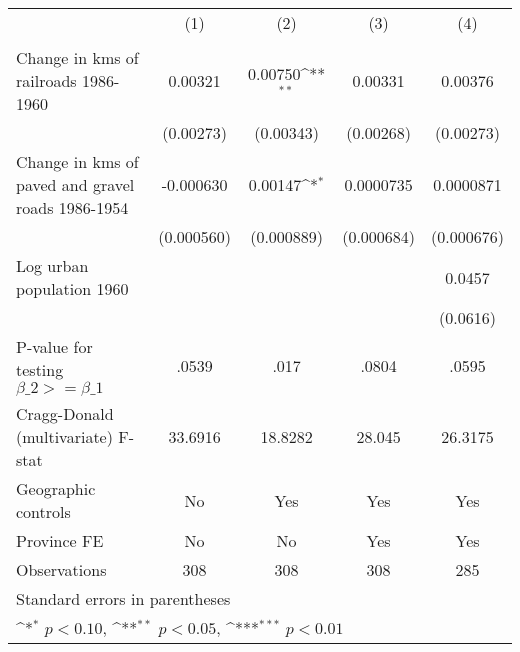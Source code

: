 {
\def\sym#1{\ifmmode^{#1}\else\(^{#1}\)\fi}
\begin{tabular}{l*{4}{c}}
\hline\hline
                &\multicolumn{1}{c}{(1)}&\multicolumn{1}{c}{(2)}&\multicolumn{1}{c}{(3)}&\multicolumn{1}{c}{(4)}\\
                &\multicolumn{1}{c}{}&\multicolumn{1}{c}{}&\multicolumn{1}{c}{}&\multicolumn{1}{c}{}\\
\hline
Change in kms of railroads 1986-1960&  0.00321         &  0.00750\sym{**} &  0.00331         &  0.00376         \\
                &(0.00273)         &(0.00343)         &(0.00268)         &(0.00273)         \\
[1em]
Change in kms of paved and gravel roads 1986-1954&-0.000630         &  0.00147\sym{*}  &0.0000735         &0.0000871         \\
                &(0.000560)         &(0.000889)         &(0.000684)         &(0.000676)         \\
[1em]
Log urban population 1960&                  &                  &                  &   0.0457         \\
                &                  &                  &                  & (0.0616)         \\
\hline
P-value for testing $\beta\_{2} >= \beta\_{1}$&    .0539         &     .017         &    .0804         &    .0595         \\
Cragg-Donald (multivariate) F-stat&  33.6916         &  18.8282         &   28.045         &  26.3175         \\
Geographic controls&       No         &      Yes         &      Yes         &      Yes         \\
Province FE     &       No         &       No         &      Yes         &      Yes         \\
Observations    &      308         &      308         &      308         &      285         \\
\hline\hline
\multicolumn{5}{l}{\footnotesize Standard errors in parentheses}\\
\multicolumn{5}{l}{\footnotesize \sym{*} \(p<0.10\), \sym{**} \(p<0.05\), \sym{***} \(p<0.01\)}\\
\end{tabular}
}
